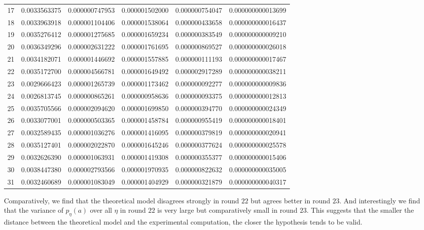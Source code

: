 \begin{center}
\begin{scriptsize}
\begin{tabular}{l*{4}{c}r}
17 & 0.0033563375 & 0.000000747953 & 0.000001502000 & 0.000000754047 & 0.000000000013699\\
18 & 0.0033963918 & 0.000001104406 & 0.000001538064 & 0.000000433658 & 0.000000000016437\\
19 & 0.0035276412 & 0.000001275685 & 0.000001659234 & 0.000000383549 & 0.000000000009210\\
20 & 0.0036349296 & 0.000002631222 & 0.000001761695 & 0.000000869527 & 0.000000000026018\\
21 & 0.0034182071 & 0.000001446692 & 0.000001557885 & 0.000000111193 & 0.000000000017467\\
22 & 0.0035172700 & 0.000004566781 & 0.000001649492 & 0.000002917289 & 0.000000000038211\\
23 & 0.0029666423 & 0.000001265739 & 0.000001173462 & 0.000000092277 & 0.000000000009836\\
24 & 0.0026813745 & 0.000000865261 & 0.000000958636 & 0.000000093375 & 0.000000000012813\\
25 & 0.0035705566 & 0.000002094620 & 0.000001699850 & 0.000000394770 & 0.000000000024349\\
26 & 0.0033077001 & 0.000000503365 & 0.000001458784 & 0.000000955419 & 0.000000000018401\\
27 & 0.0032589435 & 0.000001036276 & 0.000001416095 & 0.000000379819 & 0.000000000020941\\
28 & 0.0035127401 & 0.000002022870 & 0.000001645246 & 0.000000377624 & 0.000000000025578\\
29 & 0.0032626390 & 0.000001063931 & 0.000001419308 & 0.000000355377 & 0.000000000015406\\
30 & 0.0038447380 & 0.000002793566 & 0.000001970935 & 0.000000822632 & 0.000000000035005\\
31 & 0.0032460689 & 0.000001083049 & 0.000001404929 & 0.000000321879 & 0.000000000040317\\
\end{tabular}
\end{scriptsize}
\end{center} \par \noindent Comparatively, we find that the theoretical model disagrees strongly in round $22$ but agrees  better in round $23$. And interestingly we find that the variance of $p_{\eta}(a)$ over all $\eta$ in round $22$ is very large but comparatively small in round $23$. This suggests that the smaller the distance between the theoretical model and  the experimental computation, the closer the hypothesis tends to be valid. %
